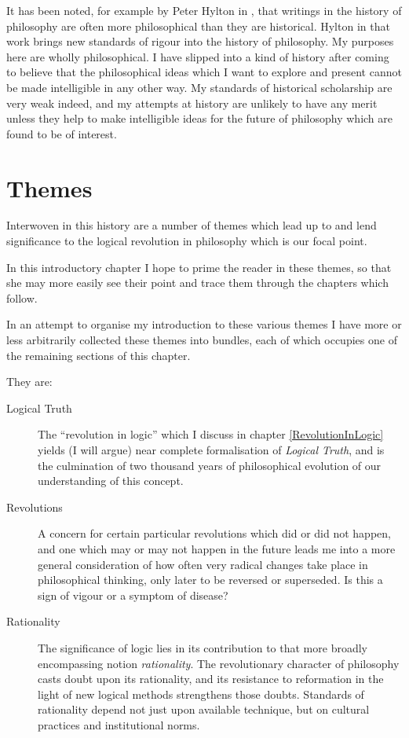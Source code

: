 It has been noted, for example by Peter Hylton in \cite{hyltonREAP}, that writings in the history of philosophy are often more philosophical than they are historical.
Hylton in that work brings new standards of rigour into the history of philosophy.
My purposes here are wholly philosophical.
I have slipped into a kind of history after coming to believe that the philosophical ideas which I want to explore and present cannot be made intelligible in any other way.
My standards of historical scholarship are very weak indeed, and my attempts at history are unlikely to have any merit unless they help to make intelligible ideas for the future of philosophy which are found to be of interest.

\section{Themes}

Interwoven in this history are a number of themes which lead up to and lend significance to the logical revolution in philosophy which is our focal point.

In this introductory chapter I hope to prime the reader in these themes, so that she may more easily see their point and trace them through the chapters which follow.

In an attempt to organise my introduction to these various themes I have more or less arbitrarily collected these themes into bundles, each of which occupies one of the remaining sections of this chapter.

They are:
\begin{description}
\item[Logical Truth]
The ``revolution in logic'' which I discuss in chapter \ref{RevolutionInLogic}
yields (I will argue) near complete formalisation of {\it Logical Truth}, and is the culmination of two thousand years of philosophical evolution of our understanding of this concept.

\item[Revolutions]
A concern for certain particular revolutions which did or did not happen, and one which may or may not happen in the future leads me into a more general consideration of how often very radical changes take place in philosophical thinking, only later to be reversed or superseded.
Is this a sign of vigour or a symptom of disease?

\item[Rationality]
The significance of logic lies in its contribution to that more broadly encompassing notion {\it rationality}.
The revolutionary character of philosophy casts doubt upon its rationality, and its resistance to reformation in the light of new logical methods strengthens those doubts.
Standards of rationality depend not just upon available technique, but on cultural practices and institutional norms.

\end{description}

